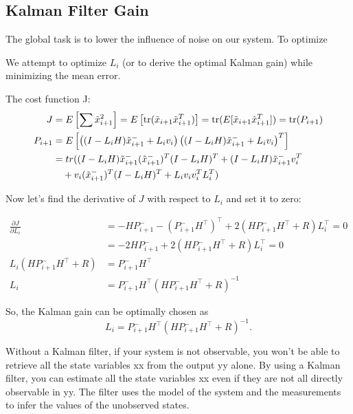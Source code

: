\subsection{Kalman Filter Gain}

The global task is to lower the influence of noise on our system. To optimize 

We attempt to optimize $L_i$ (or to derive the optimal Kalman gain) while minimizing the mean error.

The cost function J:
\[
\begin{aligned}
J &= E \left[ \sum \Tilde{x}_{i+1}^2 \right] = E\left[\text{tr}(\Tilde{x}_{i+1} \Tilde{x}_{i+1}^T)\right] = \text{tr}(E[\Tilde{x}_{i+1} \Tilde{x}_{i+1}^T]) = \text{tr}(P_{i+1}) \\
P_{i+1} &= E\left[ \left( (I-L_i H) \Tilde{x}_{i+1}^- + L_i v_i \right) \left( (I-L_i H) \Tilde{x}_{i+1}^- + L_i v_i \right)^T \right] \\
&= tr((I-L_i H) \Tilde{x}_{i+1}^- (\Tilde{x}_{i+1}^-)^T (I -L_i H)^T + (I- L_i H) \Tilde{x}_{i+1}^- v_i^T  \\
& \quad  + v_i (\Tilde{x}_{i+1}^-)^T (I-L_i H)^T + L_i v_i v_i^T L_i^T)
\end{aligned}
\]

Now let's find the derivative of \(J\) with respect to \(L_i\) and set it to zero:

\begin{align*}
    \frac{\partial J}{\partial L_i} 
    &= 
    -H P_{i+1}^- - (P_{i+1}^- H^\top)^\top + 
    2(H P_{i+1}^- H^\top + R) L_i^\top = 0 \\
    &=
    -2 H P_{i+1}^- + 2(H P_{i+1}^- H^\top + R) L_i^\top = 0 \\
    L_i (H P_{i+1}^- H^\top + R) &= P_{i+1}^- H^\top \\
    L_i &= P_{i+1}^- H^\top (H P_{i+1}^- H^\top + R)^{-1}
\end{align*}

So, the Kalman gain can be optimally chosen as 
\[
L_i = P_{i+1}^- H^\top (H P_{i+1}^- H^\top + R)^{-1}.
\]



Without a Kalman filter, if your system is not observable, you won't be able to retrieve all the state variables xx from the output yy alone.
By using a Kalman filter, you can estimate all the state variables xx even if they are not all directly observable in yy. The filter uses the 
model of the system and the measurements to infer the values of the unobserved states.

